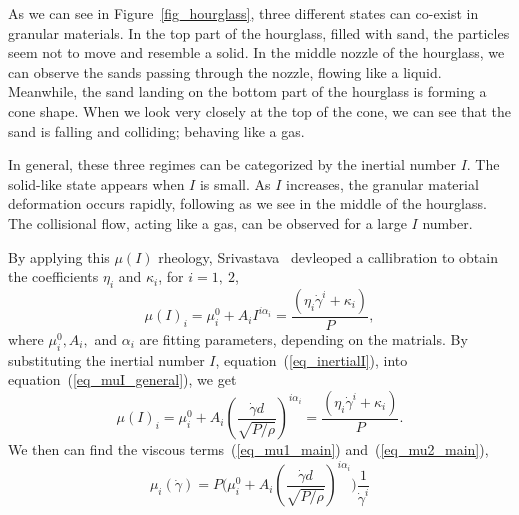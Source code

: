As we can see in Figure~\ref{fig_hourglass}, three different states can co-exist in granular materials. 
In the top part of the hourglass, filled with sand, the particles seem not to move and resemble a solid. 
In the middle nozzle of the hourglass, we can observe the sands passing through the nozzle, flowing like a liquid.
Meanwhile, the sand landing on the bottom part of the hourglass is forming a cone shape. When we look very closely at the top of the cone, we can see that the sand is falling and colliding; behaving like a gas.
\par
In general, these three regimes can be categorized by the inertial number $I$. The solid-like state appears when $I$ is small. As $I$ increases, the granular material deformation occurs rapidly, following as we see in the middle of the hourglass. The collisional flow, acting like a gas, can be observed for a large $I$ number. 
\par
By applying this $\mu(I)$ rheology, Srivastava~\cite{srivastava_viscometric_2021} devleoped a callibration to obtain the coefficients $\eta_i$ and $\kappa_i$, for $i = 1, \ 2$,
\begin{equation}
  \mu(I)_i = \mu_i^0 + A_i{ I}^{ i \alpha_i} =  \frac{(\eta_i \dot{\gamma}^i + \kappa_i)}{P},
\label{eq_muI_general}
\end{equation}
where $\mu_i^0, A_i,$ and $\alpha_i$ are fitting parameters, depending on the matrials. 
By substituting the inertial number $I$, equation~(\ref{eq_inertialI}), into equation~(\ref{eq_muI_general}),
we get
\begin{equation}
  \mu(I)_i = \mu_i^0 + A_i {\left(  \frac{\dot{\gamma} d }{\sqrt{P/\rho}}\right) }^{ i \alpha_i} =  \frac{(\eta_i \dot{\gamma}^i + \kappa_i)}{P}.
\label{eq_muI_I}
\end{equation}
We then can find the viscous terms~(\ref{eq_mu1_main}) and~(\ref{eq_mu2_main}),
\begin{equation}
  \mu_i  (\dot{\gamma})= 
 P \Biggl( \mu_i^0 + A_i {\left(  \frac{\dot{\gamma} d }{\sqrt{P/\rho}}\right) }^{ i \alpha_i}\Biggr) 
   \frac{1}{\dot{\gamma}^i}
\label{eq_eta1}
\end{equation}

